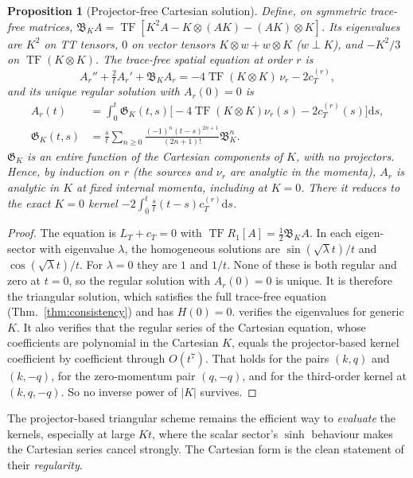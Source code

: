 \documentclass[11pt]{article}
\newtheorem{proposition}[theorem]{Proposition}
\theoremstyle{definition}
\theoremstyle{remark}
\newcommand{\dd}{\mathrm{d}}
\newcommand{\TF}{\operatorname{TF}}
\begin{document}
\begin{proposition}[Projector-free Cartesian solution]\label{prop:cartesian}
Define, on symmetric trace-free matrices,
$\mathfrak B_KA=\TF[K^2A-K\otimes(AK)-(AK)\otimes K]$. Its eigenvalues are $K^2$ on TT tensors,
$0$ on vector tensors $K\otimes w+w\otimes K$ ($w\perp K$), and $-K^2/3$ on $\TF(K\otimes K)$.
The trace-free spatial equation at order $r$ is
\[
A_r''+\tfrac2tA_r'+\mathfrak B_KA_r=-4\TF(K\otimes K)\,\nu_r-2c_T^{(r)},
\]
and its unique regular solution with $A_r(0)=0$ is
\[
\boxed{\begin{aligned}
A_r(t)&=\int_0^t\mathfrak G_K(t,s)\big[-4\TF(K\otimes K)\nu_r(s)-2c_T^{(r)}(s)\big]\dd s,\\
\mathfrak G_K(t,s)&=\frac st\sum_{n\ge0}\frac{(-1)^n(t-s)^{2n+1}}{(2n+1)!}\mathfrak B_K^n.
\end{aligned}}
\]
$\mathfrak G_K$ is an entire function of the Cartesian components of $K$, with no projectors.
Hence, by induction on $r$ (the sources and $\nu_r$ are analytic in the momenta),
$A_r$ is analytic in $K$ at fixed internal momenta, including at $K=0$. There it reduces to the
exact $K=0$ kernel $-2\int_0^t\frac st(t-s)c_T^{(r)}\dd s$.
\end{proposition}
\begin{proof}
The equation is $L_T+c_T=0$ with $\TF R_1[A]=\frac12\mathfrak B_KA$. In each eigen-sector with
eigenvalue $\lambda$, the homogeneous solutions are $\sin(\sqrt\lambda t)/t$ and
$\cos(\sqrt\lambda t)/t$. For $\lambda=0$ they are $1$ and $1/t$. None of these is both regular
and zero at $t=0$, so the regular solution with $A_r(0)=0$ is unique. It is therefore the
triangular solution, which satisfies the full trace-free equation (Thm.~\ref{thm:consistency})
and has $H(0)=0$.  verifies the eigenvalues for generic
$K$. It also verifies that the regular series of the Cartesian equation, whose coefficients
are polynomial in the Cartesian $K$, equals the projector-based kernel coefficient by
coefficient through $O(t^7)$. That holds for the pairs $(k,q)$ and $(k,-q)$, for the zero-momentum
pair $(q,-q)$, and for the third-order kernel at $(k,q,-q)$. So no inverse power of $|K|$
survives.
\end{proof}
The projector-based triangular scheme remains the efficient way to \emph{evaluate} the
kernels, especially at large $Kt$, where the scalar sector's $\sinh$ behaviour makes the
Cartesian series cancel strongly. The Cartesian form is the clean statement of their
\emph{regularity}.
\end{document}
